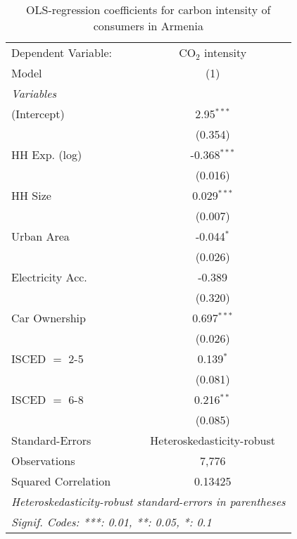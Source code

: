 
\begin{table}[htbp!]
   \centering
   \small
   \begin{adjustbox}{width = 1\textwidth, max height = 0.95\textheight, center}
      \begin{threeparttable}[b]
         \caption{\label{tab:OLS_1_ARM} OLS-regression coefficients for carbon intensity of consumers in Armenia}
         \begin{tabular}{lc}
            \tabularnewline \midrule \midrule
            Dependent Variable: & CO$_{2}$ intensity\\  
            Model               & (1)\\  
            \midrule
            \emph{Variables}\\
            (Intercept)         & 2.95$^{***}$\\   
                                & (0.354)\\   
            HH Exp. (log)       & -0.368$^{***}$\\   
                                & (0.016)\\   
            HH Size             & 0.029$^{***}$\\   
                                & (0.007)\\   
            Urban Area          & -0.044$^{*}$\\   
                                & (0.026)\\   
            Electricity Acc.    & -0.389\\   
                                & (0.320)\\   
            Car Ownership       & 0.697$^{***}$\\   
                                & (0.026)\\   
            ISCED $=$ 2-5       & 0.139$^{*}$\\   
                                & (0.081)\\   
            ISCED $=$ 6-8       & 0.216$^{**}$\\   
                                & (0.085)\\   
            \midrule 
            Standard-Errors     & Heteroskedasticity-robust \\   
            Observations        & 7,776\\  
            Squared Correlation & 0.13425\\  
            \midrule \midrule
            \multicolumn{2}{l}{\emph{Heteroskedasticity-robust standard-errors in parentheses}}\\
            \multicolumn{2}{l}{\emph{Signif. Codes: ***: 0.01, **: 0.05, *: 0.1}}\\
         \end{tabular}
         

\end{threeparttable}
\end{adjustbox}
\end{table}
